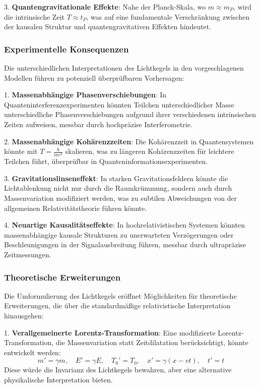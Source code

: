 \documentclass[a4paper,12pt]{article}
\begin{document}
3. \textbf{Quantengravitationale Effekte}: Nahe der Planck-Skala, wo \( m \approx m_P \), wird die intrinsische Zeit \( T \approx t_P \), was auf eine fundamentale Verschränkung zwischen der kausalen Struktur und quantengravitativen Effekten hindeutet.

\subsubsection{Experimentelle Konsequenzen}
Die unterschiedlichen Interpretationen des Lichtkegels in den vorgeschlagenen Modellen führen zu potenziell überprüfbaren Vorhersagen:

1. \textbf{Massenabhängige Phasenverschiebungen}: In Quanteninterferenzexperimenten könnten Teilchen unterschiedlicher Masse unterschiedliche Phasenverschiebungen aufgrund ihrer verschiedenen intrinsischen Zeiten aufweisen, messbar durch hochpräzise Interferometrie.

2. \textbf{Massenabhängige Kohärenzzeiten}: Die Kohärenzzeit in Quantensystemen könnte mit \( T = \frac{\hbar}{m c^2} \) skalieren, was zu längeren Kohärenzzeiten für leichtere Teilchen führt, überprüfbar in Quanteninformationsexperimenten.

3. \textbf{Gravitationslinseneffekt}: In starken Gravitationsfeldern könnte die Lichtablenkung nicht nur durch die Raumkrümmung, sondern auch durch Massenvariation modifiziert werden, was zu subtilen Abweichungen von der allgemeinen Relativitätstheorie führen könnte.

4. \textbf{Neuartige Kausalitätseffekte}: In hochrelativistischen Systemen könnten massenabhängige kausale Strukturen zu unerwarteten Verzögerungen oder Beschleunigungen in der Signalausbreitung führen, messbar durch ultrapräzise Zeitmessungen.

\subsubsection{Theoretische Erweiterungen}
Die Umformulierung des Lichtkegels eröffnet Möglichkeiten für theoretische Erweiterungen, die über die standardmäßige relativistische Interpretation hinausgehen:

1. \textbf{Verallgemeinerte Lorentz-Transformation}: Eine modifizierte Lorentz-Transformation, die Massenvariation statt Zeitdilatation berücksichtigt, könnte entwickelt werden:
\begin{equation}
	m' = \gamma m, \quad E' = \gamma E, \quad T_0' = T_0, \quad x' = \gamma(x - vt), \quad t' = t
\end{equation}
Diese würde die Invarianz des Lichtkegels bewahren, aber eine alternative physikalische Interpretation bieten.
\end{document}
